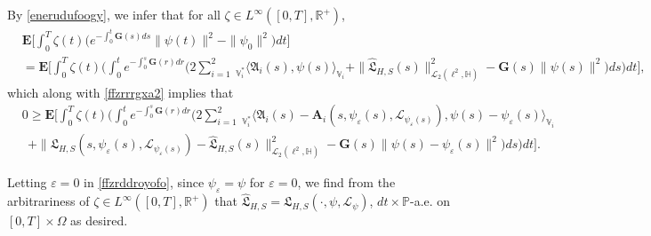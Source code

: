 \documentclass[11pt]{article}
\renewcommand{\geq}{\geqslant}  %
\numberwithin{equation}{section}
\begin{document}
By \eqref{enerudufoogy}, we
infer that for all $\zeta\in L^\infty([0,T],\mathbb{R}^+)$,
	\begin{align*}&	\mathbf{E}\Bigg[\int_0^{T}
\zeta(t)\Bigg(
	e^{-\int_0^{t}
\mathbf{G}(s)ds} \|\psi(t)
\|^2-
\|\psi_0\|^2\Bigg)dt\Bigg]
		\nonumber\\&
		=\mathbf{E}\Bigg[\int_0^{T}\zeta(t)\Bigg(
		\int_0^{t
		}
		e^{-\int_0^s\mathbf{G}(r)
dr}
	\Bigg(2
\sum_{i=1}^2\   _{\mathbb{V}^*_i}
		\langle \mathfrak{A}_i(s) ,\psi(s)\rangle_{\mathbb{V}_i}
		+\|\widehat{\mathfrak{L}}_{H,S}(s)
		\|^2_{\mathcal{L}_2(\ell^2,
			\mathbb{H})}
	-
		\mathbf{G}(s)
		\|\psi(s)\|^2
		\Bigg)ds\Bigg)dt \Bigg],
	\end{align*}
which along with \eqref{ffzrrrgxa2}  implies that \begin{align}&\label{ffzrddroyofo}
		0\geq
		\mathbf{E}\Bigg[\int_0^{T}
\zeta(t)\Bigg(
		\int_0^{t}
e^{-\int_0^s\mathbf{G}(r)dr}
		\Bigg(2\sum_{i=1}^2\ _{\mathbb{V}_i^*}
		\langle \mathfrak{A}_i(s)-
\mathbf{A}_i(s,\psi_\varepsilon(s),
\mathcal{L}_{\psi_\varepsilon(s)}) ,\psi(s)-\psi_\varepsilon(s)
\rangle_{\mathbb{V}_i}
		\nonumber\\&  \ \ +\|\mathfrak{L}_{H,S}(s,\psi_\varepsilon(s),
\mathcal{L}_{\psi_\varepsilon(s)})-
		\widehat{\mathfrak{L}}_{H,S}(s)
		\|^2_{\mathcal{L}_2(\ell^2,
			\mathbb{H})} -
		\mathbf{G}(s)
		\|\psi(s)-\psi_\varepsilon(s)\|^2
		\Bigg)ds\Bigg)dt\Bigg].
	\end{align}
	
	
	
	Letting $\varepsilon =0$
	in   \eqref{ffzrddroyofo},
since $\psi_\varepsilon =\psi$
for $\varepsilon =0$, we find  from
 the arbitrariness of $\zeta\in L^\infty([0,T],\mathbb{R}^+)$ that $\widehat{\mathfrak{L}}_{H,S}=
\mathfrak{L}_{H,S}(\cdot,
\psi,\mathcal{L}_{\psi})$, $dt\times\mathbb{P}$-\mbox{a.e.} on $[0,T]\times\Omega$ as desired.
\end{document}
